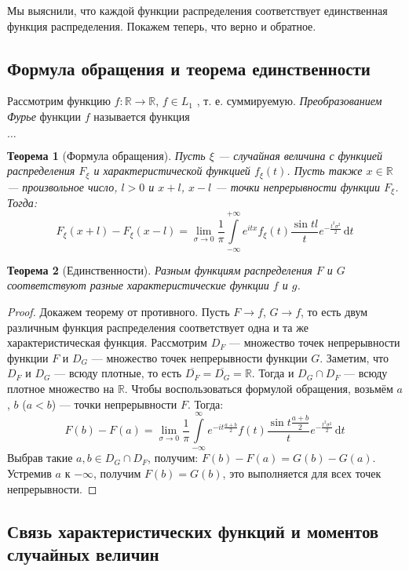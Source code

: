 \documentclass[11pt,openany,a4paper]{scrartcl}
\theoremstyle{plain}
\newtheorem{theorem}{Теорема}[subsection]
\theoremstyle{definition}
\newcommand\mb{\mathbb}
\newcommand\real{\mb R}
\newcommand{\dif}{\, \mathrm d}
\newcommand{\ol}{\overline}
\begin{document}
Мы выяснили, что каждой функции распределения соответствует единственная функция
распределения. Покажем теперь, что верно и обратное.

\subsection{Формула обращения и теорема единственности}

Рассмотрим функцию $f: \real \to \real$, $f \in L_1$ , т. е. суммируемую.
\emph{Преобразованием Фурье} функции $f$ называется функция

$\ldots$

\begin{theorem}[Формула обращения]
    Пусть $\xi$ — случайная величина с функцией распределения $F_\xi$ и
    характеристической функцией $f_\xi(t)$. Пусть также $x \in \real$ — 
    произвольное число, $l > 0$ и $x + l$, $x - l$ — точки непрерывности функции
    $F_\xi$. Тогда:
    $$
    F_\xi(x+l) - F_\xi(x-l) =
    \lim\limits_{\sigma \to 0} \frac{1}{\pi} \int\limits_{-\infty}^{+\infty}
    e^{itx} f_\xi(t) \frac{\sin tl}{t}e^{-\frac{t^2\sigma^2}{2}} \dif t
    $$
\end{theorem}

\begin{theorem}[Единственности]
    Разным функциям распределения $F$ и $G$ соответствуют разные 
    характеристические функции $f$ и $g$.
\end{theorem}
\begin{proof}
    Докажем теорему от противного. Пусть $F \to f$, $G \to f$, то есть двум 
    различным функция распределения соответствует одна и та же характеристическая
    функция. Рассмотрим $D_F$ — множество точек непрерывности функции $F$ и
    $D_G$ — множество точек непрерывности функции $G$. Заметим, что $D_F$ и $D_G$ 
    — всюду плотные, то есть $\ol{D_F} = \ol{D_G} = \real$. Тогда и $D_G \cap D_F$
    — всюду плотное множество на $\real$. Чтобы воспользоваться формулой 
    обращения, возьмём $a$, $b$ ($a < b$) — точки непрерывности $F$. Тогда:
    $$
    F(b) - F(a) = \lim\limits_{\sigma \to 0} \frac{1}{\pi}
    \int\limits_{-\infty}^{\infty} e^{-it\frac{a+b}{2}}f(t)
    \frac{\sin t\frac{a + b}{2}}{t}e^{-\frac{t^2\sigma^2}{2}}\dif t
    $$
    Выбрав такие $a, b \in D_G \cap D_F$, получим:
    $F(b) - F(a) = G(b) - G(a)$. Устремив $a$ к $-\infty$, получим $F(b) = G(b)$,
    это выполняется для всех точек непрерывности.
\end{proof}

\subsection{Связь характеристических функций и моментов случайных величин}
\end{document}
